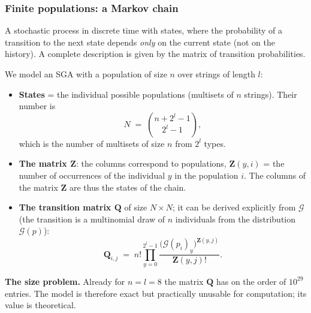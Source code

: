 \documentclass[11pt,a4paper]{article}
\theoremstyle{definition}
\begin{document}
\subsubsection{Finite populations: a Markov chain}

\begin{defbox}
A stochastic process in discrete time with states, where the probability of a
transition to the next state depends \emph{only} on the current state (not on
the history). A complete description is given by the matrix of transition
probabilities.
\end{defbox}

We model an SGA with a population of size $n$ over strings of length $l$:
\begin{itemize}
\item \textbf{States} = the individual possible populations (multisets of $n$
  strings). Their number is
  \[
  N \;=\; \binom{n + 2^l - 1}{\,2^l - 1\,},
  \]
  which is the number of multisets of size $n$ from $2^l$ types.
\item \textbf{The matrix $\mathbf{Z}$}: the columns correspond to populations,
  $\mathbf{Z}(y,i)$ = the number of occurrences of the individual $y$ in the
  population $i$. The columns of the matrix $\mathbf{Z}$ are thus the states of
  the chain.
\item \textbf{The transition matrix $\mathbf{Q}$} of size $N \times N$; it can
  be derived explicitly from $\mathcal{G}$ (the transition is a multinomial draw
  of $n$ individuals from the distribution $\mathcal{G}(p)$):
  \[
  \mathbf{Q}_{i,j} \;=\; n! \prod_{y=0}^{2^l-1}
  \frac{\big(\mathcal{G}(p_i)_y\big)^{\mathbf{Z}(y,j)}}{\mathbf{Z}(y,j)!}.
  \]
\end{itemize}

\textbf{The size problem.} Already for $n = l = 8$ the matrix $\mathbf{Q}$ has
on the order of $10^{29}$ entries. The model is therefore exact but practically
unusable for computation; its value is theoretical.
\end{document}
